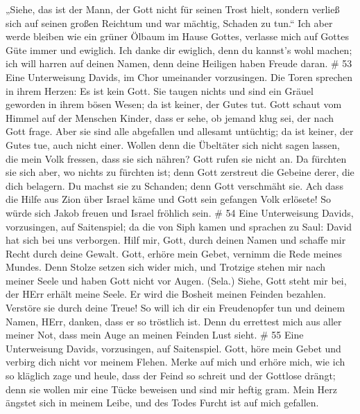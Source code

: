  „Siehe, das ist der Mann, der Gott nicht für seinen Trost
hielt, sondern verließ sich auf seinen großen Reichtum und war mächtig,
Schaden zu tun.``  Ich aber werde bleiben wie ein grüner
Ölbaum im Hause Gottes, verlasse mich auf Gottes Güte immer und
ewiglich.  Ich danke dir ewiglich, denn du kannst's wohl
machen; ich will harren auf deinen Namen, denn deine Heiligen haben
Freude daran. \# 53  Eine Unterweisung Davids, im Chor
umeinander vorzusingen.  Die Toren sprechen in ihrem Herzen:
Es ist kein Gott. Sie taugen nichts und sind ein Gräuel geworden in
ihrem bösen Wesen; da ist keiner, der Gutes tut.  Gott
schaut vom Himmel auf der Menschen Kinder, dass er sehe, ob jemand klug
sei, der nach Gott frage.  Aber sie sind alle abgefallen und
allesamt untüchtig; da ist keiner, der Gutes tue, auch nicht einer.
 Wollen denn die Übeltäter sich nicht sagen lassen, die mein
Volk fressen, dass sie sich nähren? Gott rufen sie nicht an.
 Da fürchten sie sich aber, wo nichts zu fürchten ist; denn
Gott zerstreut die Gebeine derer, die dich belagern. Du machst sie zu
Schanden; denn Gott verschmäht sie.  Ach dass die Hilfe aus
Zion über Israel käme und Gott sein gefangen Volk erlösete! So würde
sich Jakob freuen und Israel fröhlich sein. \# 54  Eine
Unterweisung Davids, vorzusingen, auf Saitenspiel;  da die
von Siph kamen und sprachen zu Saul: David hat sich bei uns verborgen.
 Hilf mir, Gott, durch deinen Namen und schaffe mir Recht
durch deine Gewalt.  Gott, erhöre mein Gebet, vernimm die
Rede meines Mundes.  Denn Stolze setzen sich wider mich, und
Trotzige stehen mir nach meiner Seele und haben Gott nicht vor Augen.
(Sela.)  Siehe, Gott steht mir bei, der HErr erhält meine
Seele.  Er wird die Bosheit meinen Feinden bezahlen.
Verstöre sie durch deine Treue!  So will ich dir ein
Freudenopfer tun und deinem Namen, HErr, danken, dass er so tröstlich
ist.  Denn du errettest mich aus aller meiner Not, dass mein
Auge an meinen Feinden Lust sieht. \# 55  Eine Unterweisung
Davids, vorzusingen, auf Saitenspiel.  Gott, höre mein Gebet
und verbirg dich nicht vor meinem Flehen.  Merke auf mich
und erhöre mich, wie ich so kläglich zage und heule,  dass
der Feind so schreit und der Gottlose drängt; denn sie wollen mir eine
Tücke beweisen und sind mir heftig gram.  Mein Herz ängstet
sich in meinem Leibe, und des Todes Furcht ist auf mich gefallen.
